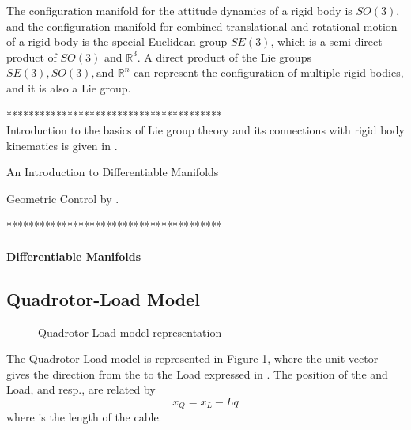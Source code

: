 The configuration manifold for the attitude dynamics of a rigid body is $ SO(3) $, and the configuration manifold for combined translational and rotational motion of a rigid body is the special Euclidean group $ SE(3) $, which is a semi-direct product of $ SO(3)  $ and $ \mathbb{R}^3 $. A direct product of the Lie groups $ SE(3), SO(3), \text{and } \mathbb{R}^n $ can represent the configuration of multiple rigid bodies, and it is also a Lie group. 


***************************************\\
Introduction to the basics of Lie group theory and its connections with rigid body kinematics is given in \cite{Murray1994}. 

An Introduction to Differentiable Manifolds \cite{Boothby2003}

Geometric Control by \cite{Bullo2005}.

***************************************\\

\paragraph{Differentiable Manifolds}


\subsection{Quadrotor-Load Model}	

\begin{figure}[h!]
	\centering
	\caption{Quadrotor-Load model representation\label{fig:QRLmodel}}
\end{figure}		
The Quadrotor-Load model is represented in Figure \ref{fig:QRLmodel}, where the unit vector  gives the direction from the  to the Load expressed in \BF.
The position of the  and Load,  and  resp., are related by
\begin{equation}\label{eq:xQ2xL}
x_Q=x_L-Lq
\end{equation}
where  is the length of the cable.


